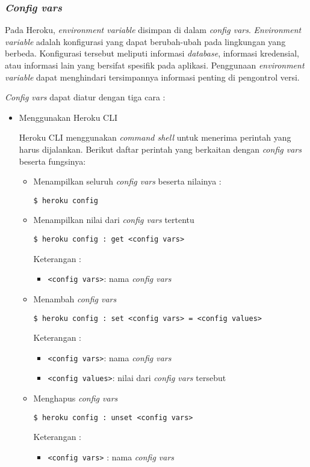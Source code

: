 \subsubsection{\textit{Config vars}}
Pada Heroku, \textit{environment variable} disimpan di dalam \textit{config vars}. \textit{Environment variable} adalah konfigurasi yang dapat berubah-ubah pada lingkungan yang berbeda. Konfigurasi tersebut meliputi informasi \textit{database}, informasi kredensial, atau informasi lain yang bersifat spesifik pada aplikasi. Penggunaan \textit{environment variable} dapat menghindari tersimpannya informasi penting di pengontrol versi.

\textit{Config vars} dapat diatur dengan tiga cara : 
\begin{itemize}
\item Menggunakan Heroku CLI

Heroku CLI menggunakan \textit{command shell} untuk menerima perintah yang harus dijalankan. Berikut daftar perintah yang berkaitan dengan \textit{config vars} beserta fungsinya:
\begin{itemize}
\item Menampilkan seluruh \textit{config vars} beserta nilainya : 
\begin{lstlisting}
$ heroku config
\end{lstlisting}

\item Menampilkan nilai dari \textit{config vars} tertentu 
\begin{lstlisting}
$ heroku config : get <config vars>
\end{lstlisting}
Keterangan :
\begin{itemize}
\item \texttt{<config vars>}: nama \textit{config vars}
\end{itemize}

\item Menambah \textit{config vars}
\begin{lstlisting}
$ heroku config : set <config vars> = <config values>
\end{lstlisting}
Keterangan :
\begin{itemize}
\item \texttt{<config vars>}: nama \textit{config vars}
\item \texttt{<config values>}: nilai dari \textit{config vars} tersebut
\end{itemize}

\item Menghapus \textit{config vars}
\begin{lstlisting}
$ heroku config : unset <config vars>
\end{lstlisting}
Keterangan :
\begin{itemize}
\item \texttt{<config vars>} : nama \textit{config vars}
\end{itemize}
\end{itemize}


\end{itemize}

